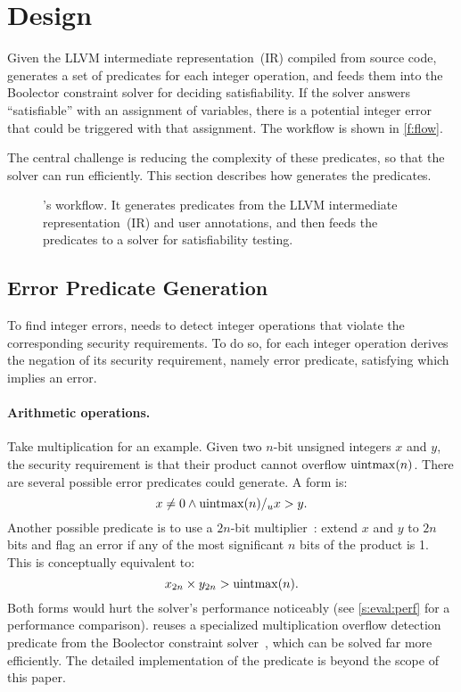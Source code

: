 \section{Design}
\label{s:gen}

Given the LLVM intermediate
representation~(IR) compiled from source code, \sys generates a set
of predicates for each integer operation, and feeds them into the
Boolector constraint solver for deciding satisfiability.  If the
solver answers ``satisfiable'' with an assignment of variables,
there is a potential integer error that could be triggered with that assignment.
The workflow is shown in \autoref{f:flow}.

The central challenge is reducing the complexity of these predicates,
so that the solver can run efficiently.  This section describes how
\sys generates the predicates.

\begin{figure}
\centering
\resizebox{\linewidth}{!}{

}
\caption{\sys's workflow.  It generates predicates from the LLVM
intermediate representation~(IR) and user annotations, and then feeds
the predicates to a solver for satisfiability testing.}
\label{f:flow}
\end{figure}

\subsection{Error Predicate Generation}
\label{s:gen:err}

To find integer errors, \sys needs to detect integer operations
that violate the corresponding security requirements.
To do so, for each integer operation \sys derives
the negation of its security requirement, namely error predicate,
satisfying which implies an error.

\paragraph{Arithmetic operations.}
Take multiplication for an example.  Given two $n$-bit unsigned
integers $x$ and $y$, the security requirement is that their product
cannot overflow $\operatorname{uintmax}(n)$.  There are several possible error
predicates \sys could generate.
A \naive form is:
\begin{equation*}
x \neq 0 \land \operatorname{uintmax}(n) /_u x > y.
\end{equation*}
Another possible predicate is to use a $2n$-bit
multiplier~\cite{molnar:catchconv}: extend $x$ and $y$ to $2n$ bits
and flag an error if any of the most significant $n$ bits of the
product is 1.  This is conceptually equivalent to:
\begin{equation*}
x_{2n} \times y_{2n} > \operatorname{uintmax}(n).
\end{equation*}
Both forms would hurt the solver's performance noticeably
(see \autoref{s:eval:perf} for a performance comparison).
%
\sys reuses a specialized multiplication overflow detection predicate
from the Boolector constraint
solver~\cite[\chapterautorefname~3.5]{brummayer:phd}, which can be
solved far more efficiently.  The detailed implementation of the
predicate is beyond the scope of this paper.

